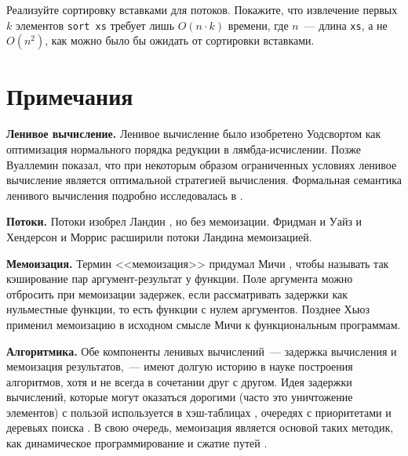 \begin{exercise}\label{ex:4.2}
  Реализуйте сортировку вставками для потоков. Покажите, что
  извлечение первых $k$ элементов \lstinline!sort xs! требует лишь 
  $O (n \cdot k)$ времени, где $n$~--- длина \lstinline!xs!, а не
  $O(n^2)$, как можно было бы ожидать от сортировки вставками.
\end{exercise}

\section{Примечания}
\label{sc:4.3}

\textbf{Ленивое вычисление.} Ленивое вычисление было изобретено
Уодсвортом \cite{Wadsworth1971} как оптимизация нормального порядка
редукции в лямбда-исчислении. Позже Вуаллемин \cite{Vuillemin1974}
показал, что при некоторым образом ограниченных условиях ленивое
вычисление является оптимальной стратегией вычисления. Формальная
семантика ленивого вычисления подробно исследовалась в
\cite{Josephs1989, Launchbury1993, OkasakiLeeTarditi1994, Ariola-etal1995}.

\noindent
\textbf{Потоки.} Потоки изобрел Ландин \cite{Landin1965}, но без
мемоизации. Фридман и Уайз \cite{FriedmanWise1976} и Хендерсон и
Моррис \cite{HendersonMorris1976} расширили потоки Ландина
мемоизацией.

\noindent
\textbf{Мемоизация.} Термин <<мемоизация>> придумал Мичи
\cite{Michie1968}, чтобы называть так кэширование пар
аргумент-результат у функции. Поле аргумента можно отбросить при мемоизации
задержек, если рассматривать задержки как нульместные функции, то
есть функции с нулем аргументов. Позднее Хьюз \cite{Hughes1985}
применил мемоизацию в исходном смысле Мичи к функциональным
программам.

\noindent
\textbf{Алгоритмика.} Обе компоненты ленивых вычислений~--- задержка
вычисления и мемоизация результатов,~--- имеют долгую историю в науке
построения алгоритмов, хотя и не всегда в сочетании друг с
другом. Идея задержки вычислений, которые могут оказаться дорогими
(часто это уничтожение элементов) с пользой используется в
хэш-таблицах \cite{vanWykVitter1986}, очередях с приоритетами
\cite{SleatorTarjan1986b, FreamanTarjan1987} и деревьях поиска
\cite{Driscoll-etal1989}. В свою очередь, мемоизация является основой
таких методик, как динамическое программирование \cite{Bellman1957} и
сжатие путей \cite{HopcroftUllman1973, TarjanvanLeeuwen1984}.

